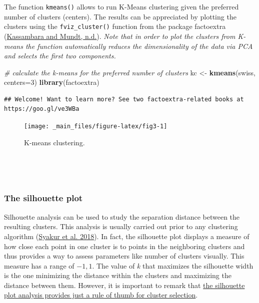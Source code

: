 \documentclass[
]{article}
\newenvironment{Shaded}{\begin{snugshade}}{\end{snugshade}}
\newcommand{\AttributeTok}[1]{\textcolor[rgb]{0.13,0.29,0.53}{#1}}
\newcommand{\CommentTok}[1]{\textcolor[rgb]{0.56,0.35,0.01}{\textit{#1}}}
\newcommand{\DecValTok}[1]{\textcolor[rgb]{0.00,0.00,0.81}{#1}}
\newcommand{\FunctionTok}[1]{\textcolor[rgb]{0.13,0.29,0.53}{\textbf{#1}}}
\newcommand{\NormalTok}[1]{#1}
\newcommand{\OtherTok}[1]{\textcolor[rgb]{0.56,0.35,0.01}{#1}}
\newcommand{\SpecialCharTok}[1]{\textcolor[rgb]{0.81,0.36,0.00}{\textbf{#1}}}
\begin{document}
The function \texttt{kmeans()} allows to run K-Means clustering given the
preferred number of clusters (centers). The results can be appreciated
by plotting the clusters using the \texttt{fviz\_cluster()} function from the
package factoextra (\protect\hyperlink{ref-kassambara}{Kassambara and Mundt, n.d.}). \emph{Note that in order to plot the
clusters from K-means the function automatically reduces the
dimensionality of the data via PCA and selects the first two
components.}

\begin{Shaded}
\begin{Highlighting}[]
\CommentTok{\# calculate the k{-}means for the preferred number of clusters}
\NormalTok{kc }\OtherTok{\textless{}{-}} \FunctionTok{kmeans}\NormalTok{(swiss, }\AttributeTok{centers=}\DecValTok{3}\NormalTok{)}
\FunctionTok{library}\NormalTok{(factoextra) }
\end{Highlighting}
\end{Shaded}

\begin{verbatim}
## Welcome! Want to learn more? See two factoextra-related books at https://goo.gl/ve3WBa
\end{verbatim}

\begin{Shaded}
\end{Shaded}

\begin{figure}[H]

{\centering \texttt{[image: \_main\_files/figure-latex/fig3-1]} 

}

\caption{K-means clustering.}\label{fig:fig3}
\end{figure}

~

~

\hypertarget{the-silhouette-plot}{%
\subsubsection{The silhouette plot}\label{the-silhouette-plot}}

Silhouette analysis can be used to study the separation distance between
the resulting clusters. This analysis is usually carried out prior to
any clustering algorithm (\protect\hyperlink{ref-syakur2018}{Syakur et al. 2018}). In fact, the silhouette plot
displays a measure of how close each point in one cluster is to points
in the neighboring clusters and thus provides a way to assess parameters
like number of clusters visually. This measure has a range of \(-1, 1\).
The value of \emph{k} that maximizes the silhouette width is the one
minimizing the distance within the clusters and maximizing the distance
between them. However, it is important to remark that \ul{the silhouette
plot analysis provides just a rule of thumb for cluster
selection}.
\end{document}
